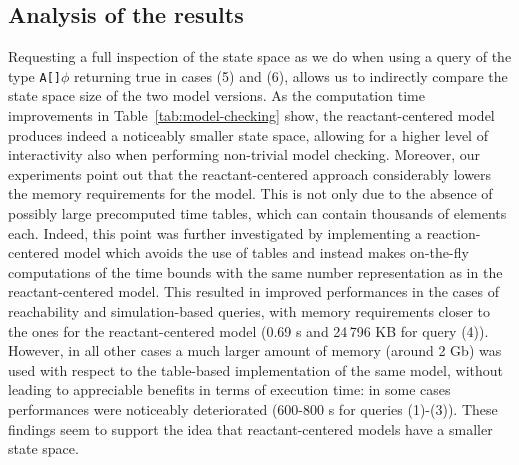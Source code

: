\documentclass{llncs}
\begin{document}
\subsection{Analysis of the results}
Requesting a full inspection of the state space
as we do when using a query of the type {\tt A[]$\phi$} returning true in cases (5) and (6), allows us to indirectly compare the state space size of the two
model versions. As the computation time improvements in Table~\ref{tab:model-checking} show, the reactant-centered model produces
indeed a noticeably smaller state space, allowing for a higher level of interactivity also when performing non-trivial model checking.
Moreover, our experiments point out that the reactant-centered approach considerably lowers the memory
requirements for the model. This is not only due to the absence of possibly large precomputed time tables,
which can contain thousands of elements each.
Indeed, this point was further investigated by implementing a reaction-centered model which
avoids the use of tables and instead makes on-the-fly computations of the time bounds with the same number representation as in the reactant-centered model.
This resulted in improved performances in the cases of reachability and simulation-based queries, with memory requirements closer to the ones for
the reactant-centered model (0.69 s and 24\,{}796 KB for query (4)). However, in all other cases a much larger amount of memory (around 2 Gb) was used
with respect to the table-based implementation of the same model, without leading to appreciable benefits in terms of execution time:
in some cases performances were noticeably deteriorated (600-800 s for queries (1)-(3)).
These findings seem to support the idea that reactant-centered models
have a smaller state space.
\end{document}
